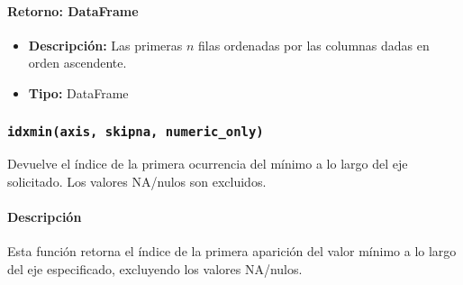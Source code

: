         \paragraph{\textbf{Retorno:} DataFrame}
        \begin{itemize}
            \item \textbf{Descripción:} Las primeras \( n \) filas ordenadas por las columnas dadas en orden ascendente.
            \item \textbf{Tipo:} DataFrame
        \end{itemize}


        \subsubsection{\texttt{idxmin(axis, skipna, numeric\_only)}} Devuelve el índice de la primera ocurrencia del mínimo a lo largo del eje solicitado. Los valores NA/nulos son excluidos.

        \paragraph{\textbf{Descripción}}
        Esta función retorna el índice de la primera aparición del valor mínimo a lo largo del eje especificado, excluyendo los valores NA/nulos.

